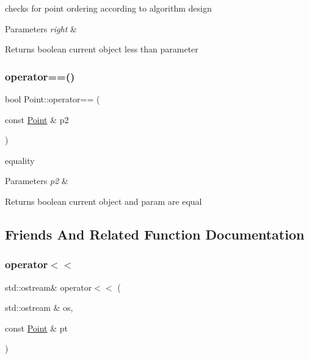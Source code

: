checks for point ordering according to algorithm design 
\begin{DoxyParams}{Parameters}
{\em right} & \\
\hline
\end{DoxyParams}
\begin{DoxyReturn}{Returns}
boolean current object less than parameter 
\end{DoxyReturn}
\mbox{\label{class_point_ac7bc64b9a683d5fb35780c739779f2fc}} 
\subsubsection{\texorpdfstring{operator==()}{operator==()}}
{\footnotesize\ttfamily bool Point\+::operator== (\begin{DoxyParamCaption}\item[{const \mbox{\hyperlink{class_point}{Point}} \&}]{p2 }\end{DoxyParamCaption})}

equality 
\begin{DoxyParams}{Parameters}
{\em p2} & \\
\hline
\end{DoxyParams}
\begin{DoxyReturn}{Returns}
boolean current object and param are equal 
\end{DoxyReturn}


\subsection{Friends And Related Function Documentation}
\mbox{\label{class_point_a2c120859855730a5ff9d2eaee48471c5}} 
\subsubsection{\texorpdfstring{operator$<$$<$}{operator<<}}
{\footnotesize\ttfamily std\+::ostream\& operator$<$$<$ (\begin{DoxyParamCaption}\item[{std\+::ostream \&}]{os,  }\item[{const \mbox{\hyperlink{class_point}{Point}} \&}]{pt }\end{DoxyParamCaption})\hspace{0.3cm}{\ttfamily [friend]}}



